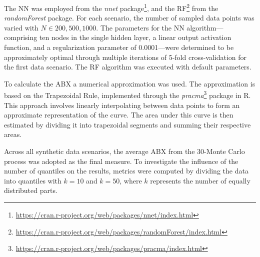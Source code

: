 The NN was employed from the \textit{nnet} package\footnote{\url{https://cran.r-project.org/web/packages/nnet/index.html}}, and the RF\footnote{\url{https://cran.r-project.org/web/packages/randomForest/index.html}} from the \textit{randomForest} package. For each scenario, the number of sampled data points was varied with $N \in {200,500,1000}$. The parameters for the NN algorithm—comprising ten nodes in the single hidden layer, a linear output activation function, and a regularization parameter of 0.0001—were determined to be approximately optimal through multiple iterations of 5-fold cross-validation for the first data scenario. The RF algorithm was executed with default parameters.

To calculate the ABX a numerical approximation was used. The approximation is based on the Trapezoidal Rule, implemented through the \textit{pracma}\footnote{\url{https://cran.r-project.org/web/packages/pracma/index.html}} package in R. This approach involves linearly interpolating between data points to form an approximate representation of the curve. The area under this curve is then estimated by dividing it into trapezoidal segments and summing their respective areas. 

Across all synthetic data scenarios, the average ABX from the 30-Monte Carlo process was adopted as the final measure. To investigate the influence of the number of quantiles on the results, metrics were computed by dividing the data into quantiles with \(k=10\) and \(k=50\), where \(k\) represents the number of equally distributed parts.